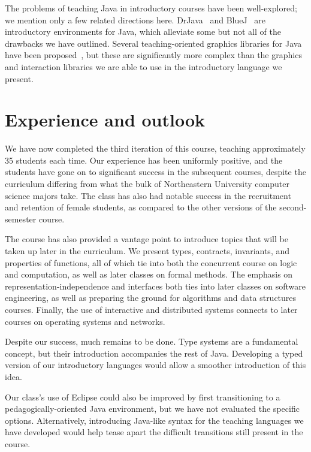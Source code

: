\documentclass[submission,copyright]{eptcs}
\begin{document}
The problems of teaching Java in introductory courses have been
well-explored; we mention only a few related directions here.
DrJava~\cite{dvanhorn:Allen2002DrJava} and
BlueJ~\cite{dvanhorn:Hsia2005Taming,dvanhorn:Kolling2003} are
introductory environments for Java, which alleviate some but not all
of the drawbacks we have outlined.
%
Several teaching-oriented graphics libraries for Java have been
proposed~\cite{dvanhorn:Bruce2001Library,dvanhorn:Alphonce2003Using},
but these are significantly more complex than the graphics and
interaction libraries we are able to use in the introductory language
we present.


\section{Experience and outlook}
\label{sec:conclusion}

We have now completed the third iteration of this course, teaching
approximately 35 students each time.  Our experience has been
uniformly positive, and the students have gone on to significant
success in the subsequent courses, despite the curriculum differing
from what the bulk of Northeastern University computer science majors
take.  The class has also had notable success in the recruitment and
retention of female students, as compared to the other versions of the
second-semester course.

The course has also provided a vantage point to introduce topics that
will be taken up later in the curriculum.  We present types,
contracts, invariants, and properties of functions, all of which tie
into both the concurrent course on logic and computation, as well as
later classes on formal methods.  The emphasis on
representation-independence and interfaces  both ties into later
classes on software engineering, as well as preparing the ground for
algorithms and data structures courses.  Finally, the use of
interactive and distributed systems connects to later courses on
operating systems and networks.

Despite our success, much remains to be done.  Type systems are a
fundamental concept, but their introduction accompanies the rest of
Java.  Developing a typed version of our introductory languages would
allow a smoother introduction of this idea.  

Our class's use of Eclipse could also be improved by first
transitioning to a pedagogically-oriented Java environment, but we
have not evaluated the specific options.  Alternatively, introducing
Java-like syntax for the teaching languages we have developed would
help tease apart the difficult transitions still present in the course.
\end{document}

